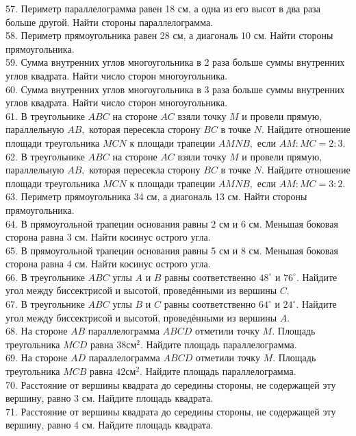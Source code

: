 \documentclass[12pt]{article}
\begin{document}
57. Периметр параллелограмма равен 18 см, а одна из его высот в два раза больше другой. Найти стороны параллелограмма.\\
58. Периметр прямоугольника равен 28 см, а диагональ 10 см. Найти стороны прямоугольника.\\
59. Сумма внутренних углов многоугольника в 2 раза больше суммы внутренних углов квадрата. Найти число сторон многоугольника.\\
60. Сумма внутренних углов многоугольника в 3 раза больше суммы внутренних углов квадрата. Найти число сторон многоугольника.\\
61. В треугольнике $ABC$ на стороне $AC$ взяли точку $M$ и провели прямую, параллельную $AB,$ которая пересекла сторону $BC$ в точке $N.$ Найдите отношение площади треугольника $MCN$ к площади трапеции $AMNB,$ если $AM:MC=2:3.$\\
62. В треугольнике $ABC$ на стороне $AC$ взяли точку $M$ и провели прямую, параллельную $AB,$ которая пересекла сторону $BC$ в точке $N.$ Найдите отношение площади треугольника $MCN$ к площади трапеции $AMNB,$ если $AM:MC=3:2.$\\
63. Периметр прямоугольника 34 см, а диагональ 13 см. Найти стороны прямоугольника.\\
64. В прямоугольной трапеции основания равны 2 см и 6 см. Меньшая боковая сторона равна 3 см. Найти косинус острого угла.\\
65. В прямоугольной трапеции основания равны 5 см и 8 см. Меньшая боковая сторона равна 4 см. Найти косинус острого угла.\\
66. В треугольнике $ABC$ углы $A$ и $B$ равны соответственно $48^\circ$ и $76^\circ.$ Найдите угол между биссектрисой и высотой, проведёнными из вершины $C.$\\
67. В треугольнике $ABC$ углы $B$ и $C$ равны соответственно $64^\circ$ и $24^\circ.$ Найдите угол между биссектрисой и высотой, проведёнными из вершины $A.$\\
68. На стороне $AB$ параллелограмма $ABCD$ отметили точку $M.$ Площадь треугольника $MCD$ равна $38\text{см}^2.$ Найдите площадь параллелограмма.\\
69. На стороне $AD$ параллелограмма $ABCD$ отметили точку $M.$ Площадь треугольника $MCB$ равна $42\text{см}^2.$ Найдите площадь параллелограмма.\\
70. Расстояние от вершины квадрата до середины стороны, не содержащей эту вершину, равно 3 см. Найдите площадь квадрата.\\
71. Расстояние от вершины квадрата до середины стороны, не содержащей эту вершину, равно 4 см. Найдите площадь квадрата.\\
\end{document}
